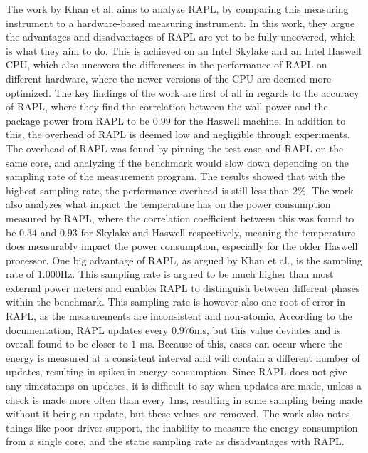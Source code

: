 The work by Khan et al.\cite[]{RAPL_in_action} aims to analyze RAPL, by comparing this measuring instrument to a hardware-based measuring instrument. In this work, they argue the advantages and disadvantages of RAPL are yet to be fully uncovered, which is what they aim to do. This is achieved on an Intel Skylake and an Intel Haswell CPU, which also uncovers the differences in the performance of RAPL on different hardware, where the newer versions of the CPU are deemed more optimized. The key findings of the work are first of all in regards to the accuracy of RAPL, where they find the correlation between the wall power and the package power from RAPL to be $0.99$ for the Haswell machine. In addition to this, the overhead of RAPL is deemed low and negligible through experiments. The overhead of RAPL was found by pinning the test case and RAPL on the same core, and analyzing if the benchmark would slow down depending on the sampling rate of the measurement program. The results showed that with the highest sampling rate, the performance overhead is still less than $2\%$. The work also analyzes what impact the temperature has on the power consumption measured by RAPL, where the correlation coefficient between this was found to be $0.34$ and $0.93$ for Skylake and Haswell respectively, meaning the temperature does measurably impact the power consumption, especially for the older Haswell processor. One big advantage of RAPL, as argued by Khan et al.\cite[]{RAPL_in_action}, is the sampling rate of $1.000$Hz. This sampling rate is argued to be much higher than most external power meters and enables RAPL to distinguish between different phases within the benchmark. This sampling rate is however also one root of error in RAPL, as the measurements are inconsistent and non-atomic. According to the documentation, RAPL updates every $0.976$ms, but this value deviates and is overall found to be closer to $1$ ms. Because of this, cases can occur where the energy is measured at a consistent interval and will contain a different number of updates, resulting in spikes in energy consumption. Since RAPL does not give any timestamps on updates, it is difficult to say when updates are made, unless a check is made more often than every $1$ms, resulting in some sampling being made without it being an update, but these values are removed. The work\cite[]{RAPL_in_action} also notes things like poor driver support, the inability to measure the energy consumption from a single core, and the static sampling rate as disadvantages with RAPL.\cite{RAPL_in_action}\nytafsnit

